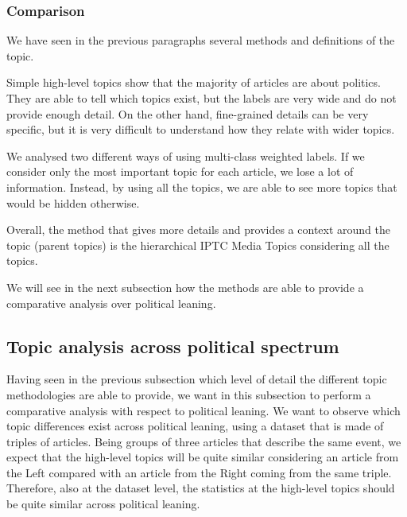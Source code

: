 

\subsubsection{\statusgreen Comparison}

We have seen in the previous paragraphs several methods and definitions of the topic.

Simple high-level topics show that the majority of articles are about politics. They are able to tell which topics exist, but the labels are very wide and do not provide enough detail.
On the other hand, fine-grained details can be very specific, but it is very difficult to understand how they relate with wider topics.

We analysed two different ways of using multi-class weighted labels. If we consider only the most important topic for each article, we lose a lot of information. Instead, by using all the topics, we are able to see more topics that would be hidden otherwise.

Overall, the method that gives more details and provides a context around the topic (parent topics) is the hierarchical IPTC Media Topics considering all the topics.

We will see in the next subsection how the methods are able to provide a comparative analysis over political leaning.



\subsection{\statusgreen Topic analysis across political spectrum}
\label{ssec:topics_topics_leaning}

Having seen in the previous subsection which level of detail the different topic methodologies are able to provide, we want in this subsection to perform a comparative analysis with respect to political leaning.
We want to observe which topic differences exist across political leaning, using a dataset that is made of triples of articles.
Being groups of three articles that describe the same event, we expect that the high-level topics will be quite similar considering an article from the Left compared with an article from the Right coming from the same triple.
Therefore, also at the dataset level, the statistics at the high-level topics should be quite similar across political leaning.

